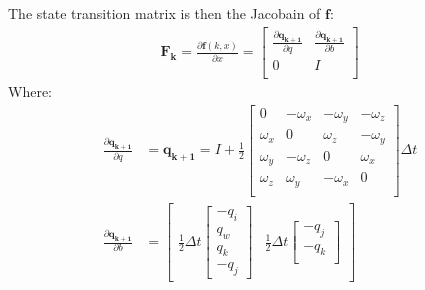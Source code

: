 \documentclass[10pt,a4paper]{article}
\newcommand{\V}[1]{\mathbf{#1}}
\begin{document}
The state transition matrix is then the Jacobain of $\V f$:
\begin{align}
  \V {F_{k}} =  \frac { \partial \V f (k, x) } {\partial x} = 
  \begin{bmatrix}
    \frac {\partial \V {q_{k+1}}} {\partial q} & \frac {\partial \V {q_{k+1}}} {\partial b} \\ 
    0 &  I \\
  \end{bmatrix}
\end{align}
Where: 
\begin{align}
  \frac {\partial \V {q_{k+1}}} {\partial q} &= 
                                               \V {q_{k+1}} = I + \frac 1 2
                                               \begin{bmatrix}
                                0 & - \omega_x  & - \omega_y  & - \omega_z  \\ 
                                \omega_x  &  0 &  \omega_z  &  -\omega_y  \\ 
                                \omega_y  &  -\omega_z  &  0 & \omega_x  \\ 
                                 \omega_z  &  \omega_y  &  -\omega_x  &  0 \\ 
                                               \end{bmatrix}  \Delta t \\ 
  \frac {\partial \V {q_{k+1}}} {\partial b} &=
                                               \begin{bmatrix}
                                                 \frac 1 2 \Delta t
                                                 \begin{bmatrix}
                                                   - q_i \\
                                                   q_w \\
                                                   q_k \\
                                                   - q_j
                                                 \end{bmatrix} & 
                                                                 \frac 1 2 \Delta t
                                                                 \begin{bmatrix}
                                                                   - q_j \\
                                                                   - q_k \\

\end{bmatrix}
\end{bmatrix}
\end{align}
\end{document}
